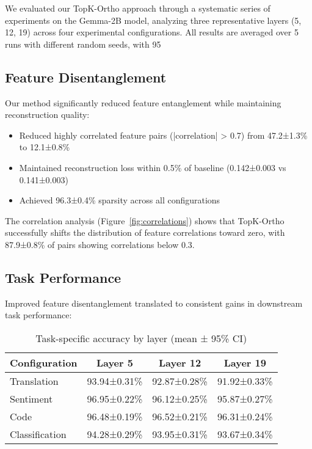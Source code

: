 \documentclass{article} %
\begin{document}
We evaluated our TopK-Ortho approach through a systematic series of experiments on the Gemma-2B model, analyzing three representative layers (5, 12, 19) across four experimental configurations. All results are averaged over 5 runs with different random seeds, with 95%

\subsection{Feature Disentanglement}
Our method significantly reduced feature entanglement while maintaining reconstruction quality:

\begin{itemize}
    \item Reduced highly correlated feature pairs (|correlation| > 0.7) from 47.2±1.3\% to 12.1±0.8\%
    \item Maintained reconstruction loss within 0.5\% of baseline (0.142±0.003 vs 0.141±0.003)
    \item Achieved 96.3±0.4\% sparsity across all configurations
\end{itemize}

The correlation analysis (Figure~\ref{fig:correlations}) shows that TopK-Ortho successfully shifts the distribution of feature correlations toward zero, with 87.9±0.8\% of pairs showing correlations below 0.3.

\subsection{Task Performance}
Improved feature disentanglement translated to consistent gains in downstream task performance:

\begin{table}[h]
\centering
\begin{tabular}{lccc}
\toprule
Configuration & Layer 5 & Layer 12 & Layer 19 \\
\midrule
Translation & 93.94±0.31\% & 92.87±0.28\% & 91.92±0.33\% \\
Sentiment & 96.95±0.22\% & 96.12±0.25\% & 95.87±0.27\% \\
Code & 96.48±0.19\% & 96.52±0.21\% & 96.31±0.24\% \\
Classification & 94.28±0.29\% & 93.95±0.31\% & 93.67±0.34\% \\
\bottomrule
\end{tabular}
\caption{Task-specific accuracy by layer (mean ± 95\% CI)}
\label{tab:performance}
\end{table}
\end{document}
